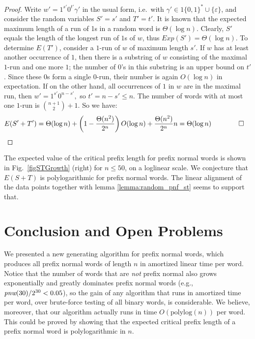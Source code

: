 \documentclass[11pt,a4paper]{llncs}
\def\polylog{\mathrm{polylog}}
\renewcommand{\epsilon}{\varepsilon}
\begin{document}
\begin{proof} 
Write $w' = 1^{s'}0^{t'}\gamma'$ in the usual form, i.e.\ with $\gamma'\in 1\{0,1\}^* \cup \{\epsilon\}$, and consider the random variables $S'=s'$ and $T'=t'$. It is known that the expected maximum length of a run of 1s in a random word is $\Theta(\log n)$\cite{GO80}. Clearly, $S'$ equals the length of the longest run of $1$s of $w$, thus $Exp(S') = \Theta(\log n)$. To determine $E(T')$, consider a $1$-run of $w$ of maximum length $s'$. If $w$ has at least another occurrence of $1$, then there is a substring of $w$ consisting of the maximal $1$-run and one more $1$; the number of $0$'s in this substring is an upper bound on $t'$. Since these $0$s form a single $0$-run, their number is again $O(\log n)$ in expectation. If on the other hand, all occurrences of $1$ in $w$ are in the maximal run, then $w' = 1^{s'}0^{n-s'},$ so $t' = n-s' \leq n$. The number of words with at most one $1$-run is ${n+1 \choose 2}+1$. So we have: 
\begin{align*}
E(S' + T') &= \Theta(\log n) + \left(1 - \frac{\Theta(n^2)}{2^n}\right)O(\log n) + \frac{\Theta(n^2)}{2^n} n = \Theta(\log n) \qquad\qed
\end{align*}
\end{proof}


The expected value of the critical prefix length for prefix normal words is shown in Fig.~\ref{figSTGrowth} (right) for $n\leq 50$, on a loglinear scale. We conjecture that $E(S+T)$ is polylogarithmic for prefix normal words. The linear alignment of the data points together with lemma \ref{lemma:random_pnf_st} seems to support that.







\section{Conclusion and Open Problems}


We presented a new generating algorithm for prefix normal words, which produces all prefix normal words of length $n$ in amortized linear  time per word. Notice that the number of words that are {\em not} prefix normal also grows exponentially and greatly dominates prefix normal words (e.g., $\textit{pnw}(30)/2^{30}<0.05$), so the gain of any algorithm that runs in amortized time per word, over brute-force testing of all binary words, is considerable. 
We believe, moreover, that our algorithm actually runs in time $O(\polylog (n))$ per word. This could be proved by showing that the expected critical prefix length of a prefix normal word is polylogarithmic in $n$.
\end{document}
